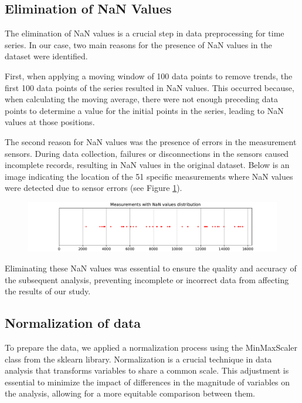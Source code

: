 \subsection{Elimination of NaN Values}

The elimination of NaN values is a crucial step in data preprocessing for time series. In our case, two main reasons for the presence of NaN values in the dataset were identified.

First, when applying a moving window of 100 data points to remove trends, the first 100 data points of the series resulted in NaN values. This occurred because, when calculating the moving average, there were not enough preceding data points to determine a value for the initial points in the series, leading to NaN values at those positions.

The second reason for NaN values was the presence of errors in the measurement sensors. During data collection, failures or disconnections in the sensors caused incomplete records, resulting in NaN values in the original dataset. Below is an image indicating the location of the 51 specific measurements where NaN values were detected due to sensor errors (see Figure \ref{nan_index_distribution}).

\begin{figure}[htbp]
    \centering
    \includegraphics[width=15 cm]{5_ChapterDesign/figuras/4_IndexNan/nan_index_distribution.pdf}
    \caption{}
    \label{nan_index_distribution}
\end{figure}


Eliminating these NaN values was essential to ensure the quality and accuracy of the subsequent analysis, preventing incomplete or incorrect data from affecting the results of our study.


\subsection{Normalization of data}

To prepare the data, we applied a normalization process using the MinMaxScaler class from the sklearn library. Normalization is a crucial technique in data analysis that transforms variables to share a common scale. This adjustment is essential to minimize the impact of differences in the magnitude of variables on the analysis, allowing for a more equitable comparison between them.

